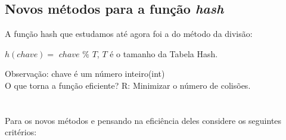 \documentclass[a4paper, 12pt]{article}
\begin{document}
\subsection{Novos métodos para a função \textit{hash}}

A função hash que estudamos até agora foi a do método da divisão:

\begin{center}
$h(chave) =$ $chave$ $\%$ $T$, $T$ é o tamanho da Tabela Hash.
\end{center}

Observação: chave é um número inteiro(int)\\

O que torna a função eficiente? R: Minimizar o número de colisões.\\
\\
\\
Para os novos métodos e pensando na eficiência deles considere os seguintes critérios:
\end{document}
